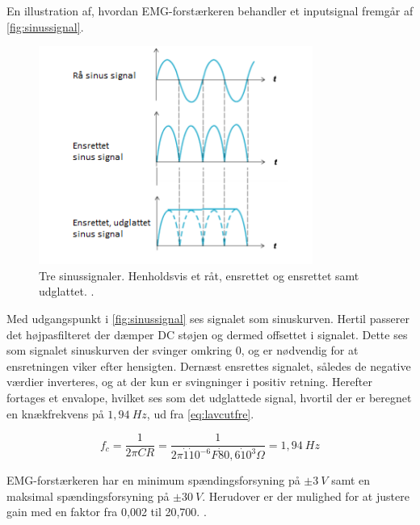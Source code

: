 En illustration af, hvordan EMG-forstærkeren behandler et inputsignal fremgår af \autoref{fig:sinussignal}.
\begin{figure}[H]
\centering
\includegraphics[width=0.8\textwidth]{figures/sinussignal.png}
\caption{Tre sinussignaler. Henholdsvis et råt, ensrettet og ensrettet samt udglattet. \citep{advancertech2013}.}
\label{fig:sinussignal}
\end{figure}

Med udgangspunkt i \autoref{fig:sinussignal} ses signalet som sinuskurven. Hertil passerer det højpasfilteret der dæmper DC støjen og dermed offsettet i signalet. Dette ses som signalet sinuskurven der svinger omkring 0, og er nødvendig for at ensretningen viker efter hensigten. Dernæst ensrettes signalet, således de negative værdier inverteres, og at der kun er svingninger i positiv retning. Herefter fortages et envalope, hvilket ses som det udglattede signal, hvortil der er beregnet en knækfrekvens på $1,94~Hz$, ud fra \autoref{eq:lavcutfre}. 

\begin{equation}\label{eq:lavcutfre}
f_c = \frac{1}{2 \pi C R} = \frac{1}{2 \pi \dot 1 \dot 10^{-6}F \dot 80,6 \dot 10^3\Omega} = 1,94~Hz
\end{equation}

EMG-forstærkeren har en minimum spændingsforsyning på $\pm 3~V$ samt en maksimal spændingsforsyning på $\pm 30~V$. Herudover er der mulighed for at justere gain med en faktor fra 0,002 til 20,700. \citep{advancertech2013}. 








